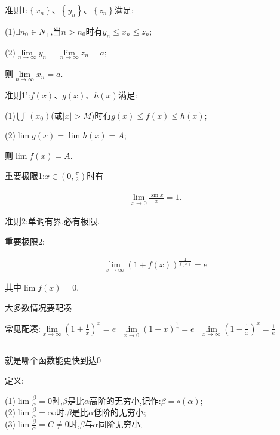 \documentclass[utf8]{ctexart}
\begin{document}
准则1:$\left\{x_n\right\} $、$\left\{y_n\right\}$、$\left\{z_n\right\}$满足:

(1)$\exists n_0\in N_+$,当$n>n_0$时有$y_n\leq x_n\leq z_n$;

(2)$\lim\limits_{n\to \infty} y_n=\lim\limits_{n\to \infty} z_n=a$;

则$\lim \limits_{n\to \infty}x_n=a$.

准则1':$f(x) $、$g(x)$、$h(x)$满足:

(1)$\bigcup \limits ^{\circ}(x_0)$(或$\left\lvert x\right\rvert>M $)时有$g(x)\leq f(x)\leq h(x)$;

(2)$\lim g(x)=\lim h(x)=A$;

则$\lim f(x)=A$.

重要极限1:$x\in \left(0,\frac{\pi}{2}\right) $时有

\begin{align}
    \displaystyle \lim \limits_{x\to 0}\frac{\sin x}{x}=1.
\end{align}

准则2:单调有界,必有极限.

重要极限2:

\begin{align}
   \displaystyle \lim \limits_{x\to \infty}(1+f(x))^{\frac{1}{f(x)}}=e 
\end{align}

其中$\lim f(x)=0$.

大多数情况要配凑

常见配凑:$\displaystyle\lim\limits_{x\to \infty}(1+\displaystyle\frac{1}{x})^{x}=e\ \ \ \lim\limits_{x\to 0}(1+x)^{\frac{1}{x}}=e\ \ \ \lim\limits_{x\to \infty}(1-\frac{1}{x})^{ x}=\frac{1}{e}$

\subsection{}

就是哪个函数能更快到达0

定义:

(1)$\displaystyle\lim \frac{\beta}{\alpha}  =0$时,$\beta $是比$\alpha $高阶的无穷小,记作:$\beta =\circ (\alpha )$;
\\

(2)$\displaystyle\lim \frac{\beta}{\alpha}=\infty$时,$\beta $是比$\alpha $低阶的无穷小;
\\

(3)$\displaystyle\lim \frac{\beta}{\alpha} =C\neq 0$时,$\beta $与$\alpha $同阶无穷小;
\\
\end{document}
